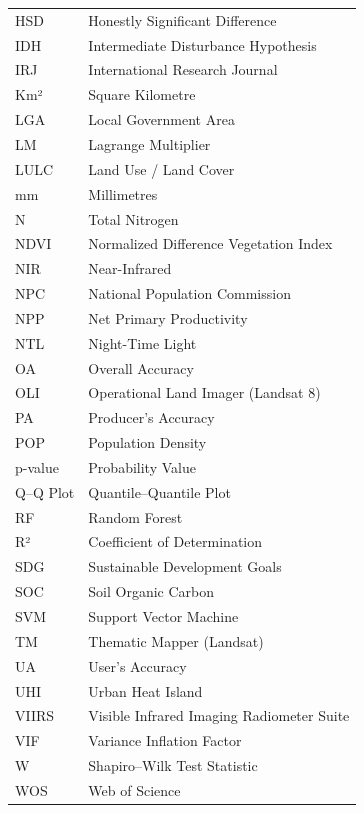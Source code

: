 \begin{longtable}[]{@{}
  >{\raggedright\arraybackslash}p{}
  >{\raggedright\arraybackslash}p{}@{}}
HSD & Honestly Significant Difference \\
IDH & Intermediate Disturbance Hypothesis \\
IRJ & International Research Journal \\
Km² & Square Kilometre \\
LGA & Local Government Area \\
LM & Lagrange Multiplier \\
LULC & Land Use / Land Cover \\
mm & Millimetres \\
N & Total Nitrogen \\
NDVI & Normalized Difference Vegetation Index \\
NIR & Near-Infrared \\
NPC & National Population Commission \\
NPP & Net Primary Productivity \\
NTL & Night-Time Light \\
OA & Overall Accuracy \\
OLI & Operational Land Imager (Landsat 8) \\
PA & Producer's Accuracy \\
POP & Population Density \\
p-value & Probability Value \\
Q--Q Plot & Quantile--Quantile Plot \\
RF & Random Forest \\
R² & Coefficient of Determination \\
SDG & Sustainable Development Goals \\
SOC & Soil Organic Carbon \\
SVM & Support Vector Machine \\
TM & Thematic Mapper (Landsat) \\
UA & User's Accuracy \\
UHI & Urban Heat Island \\
VIIRS & Visible Infrared Imaging Radiometer Suite \\
VIF & Variance Inflation Factor \\
W & Shapiro--Wilk Test Statistic \\
WOS & Web of Science \\
\end{longtable}

